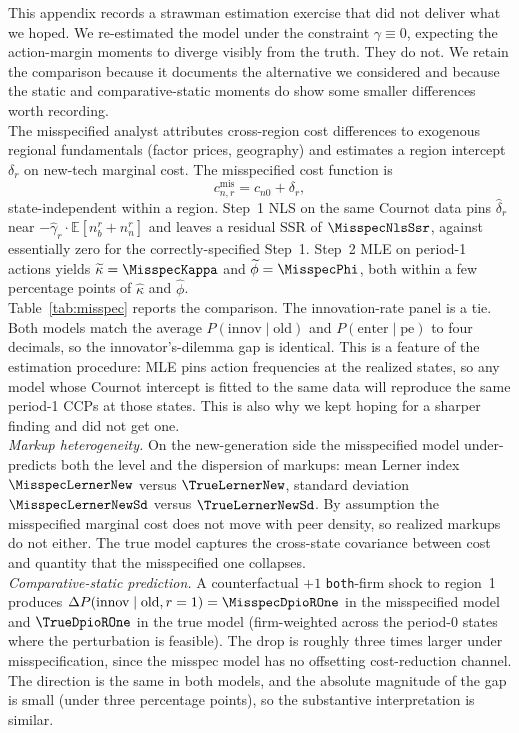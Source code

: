 \documentclass[12pt]{article}
\begin{document}
This appendix records a strawman estimation exercise that did not
deliver what we hoped. We re-estimated the model under the constraint
$\gamma \equiv 0$, expecting the action-margin moments to diverge
visibly from the truth. They do not. We retain the comparison because
it documents the alternative we considered and because the static and
comparative-static moments do show some smaller differences worth
recording.\\

The misspecified analyst attributes cross-region cost differences to
exogenous regional fundamentals (factor prices, geography) and
estimates a region intercept $\delta_r$ on new-tech marginal cost.
The misspecified cost function is
\[
   c_{n,r}^{\text{mis}} = c_{n0} + \delta_r,
\]
state-independent within a region. Step~1 NLS on the same Cournot
data pins $\widehat{\delta}_r$ near
$-\widehat{\gamma}_r \cdot \mathbb{E}[n_b^r + n_n^r]$ and leaves a
residual SSR of $\MisspecNlsSsr$, against essentially zero for the
correctly-specified Step~1. Step~2 MLE on period-1 actions yields
$\widetilde{\kappa} = \MisspecKappa$ and $\widetilde{\phi} =
\MisspecPhi$, both within a few percentage points of
$\widehat{\kappa}$ and $\widehat{\phi}$.\\

Table~\ref{tab:misspec} reports the comparison. The innovation-rate
panel is a tie. Both models match the average
$P(\text{innov} \mid \text{old})$ and $P(\text{enter} \mid \text{pe})$
to four decimals, so the innovator's-dilemma gap is identical. This is
a feature of the estimation procedure: MLE pins action frequencies at
the realized states, so any model whose Cournot intercept is fitted to
the same data will reproduce the same period-1 CCPs at those states.
This is also why we kept hoping for a sharper finding and did not
get one.\\

\noindent \textit{Markup heterogeneity.}
On the new-generation side the misspecified model under-predicts both
the level and the dispersion of markups: mean Lerner index
$\MisspecLernerNew$ versus $\TrueLernerNew$, standard deviation
$\MisspecLernerNewSd$ versus $\TrueLernerNewSd$. By assumption the
misspecified marginal cost does not move with peer density, so realized
markups do not either. The true model captures the cross-state
covariance between cost and quantity that the misspecified one
collapses.\\

\noindent \textit{Comparative-static prediction.}
A counterfactual $+1$ \texttt{both}-firm shock to region~1 produces
$\Delta P(\text{innov} \mid \text{old}, r=1) = \MisspecDpioROne$ in
the misspecified model and $\TrueDpioROne$ in the true model
(firm-weighted across the period-0 states where the perturbation is
feasible). The drop is roughly three times larger under
misspecification, since the misspec model has no offsetting
cost-reduction channel. The direction is the same in both models,
and the absolute magnitude of the gap is small (under three percentage
points), so the substantive interpretation is similar.\\
\end{document}
